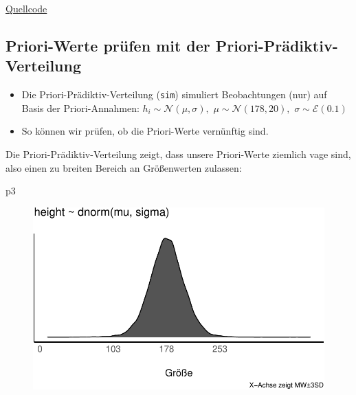 \documentclass[
  a4paper,
  DIV=11]{scrreprt}
\newenvironment{Shaded}{\begin{snugshade}}{\end{snugshade}}
\newcommand{\NormalTok}[1]{\textcolor[rgb]{0.00,0.23,0.31}{#1}}
\providecommand{\tightlist}{%
  \setlength{\itemsep}{0pt}\setlength{\parskip}{0pt}}\usepackage{longtable,booktabs,array}
\theoremstyle{definition}
\theoremstyle{remark}
\begin{document}
\href{https://bookdown.org/content/4857/geocentric-models.html\#a-gaussian-model-of-height}{Quellcode}

\hypertarget{priori-werte-pruxfcfen-mit-der-priori-pruxe4diktiv-verteilung}{%
\subsection{Priori-Werte prüfen mit der
Priori-Prädiktiv-Verteilung}\label{priori-werte-pruxfcfen-mit-der-priori-pruxe4diktiv-verteilung}}

\begin{itemize}
\tightlist
\item
  Die Priori-Prädiktiv-Verteilung (\texttt{sim}) simuliert Beobachtungen
  (nur) auf Basis der Priori-Annahmen:
  \(h_i \sim \mathcal{N}(\mu, \sigma),\)
  \(\mu \sim \mathcal{N}(178, 20),\) \(\sigma \sim \mathcal{E}(0.1)\)
\item
  So können wir prüfen, ob die Priori-Werte vernünftig sind.
\end{itemize}

Die Priori-Prädiktiv-Verteilung zeigt, dass unsere Priori-Werte ziemlich
vage sind, also einen zu breiten Bereich an Größenwerten zulassen:

\begin{Shaded}
\begin{Highlighting}[]
\NormalTok{p3}
\end{Highlighting}
\end{Shaded}

\begin{figure}[H]

{\centering \includegraphics{./gauss_files/figure-pdf/Kung-13-1.pdf}

}

\end{figure}
\end{document}
